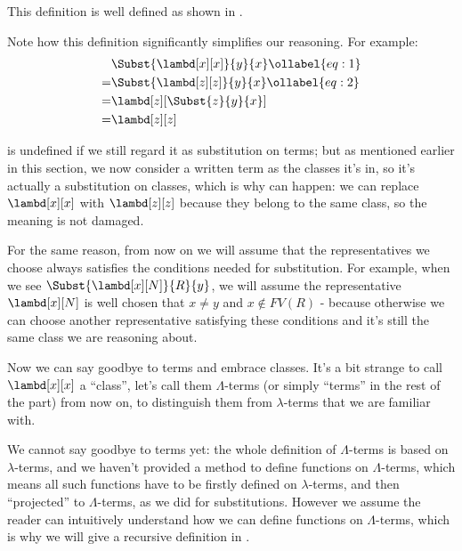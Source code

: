 \documentclass[../../../include/open-logic-section]{subfiles}
\begin{document}
This definition is well defined as shown in .

Note how this definition significantly simplifies our reasoning. For
example:
\begin{align}
  &\Subst{\lambd[x][x]}{y}{x} \ollabel{eq:1}\\
  =&\Subst{\lambd[z][z]}{y}{x} \ollabel{eq:2}\\
  =&\lambd[z][\Subst{z}{y}{x}] \\
  =&\lambd[z][z]
\end{align}

 is undefined if we still regard it as substitution on
terms; but as mentioned earlier in this section, we now consider a
written term as the classes it's in, so it's actually a substitution
on classes, which is why  can happen: we can replace
$\lambd[x][x]$ with $\lambd[z][z]$ because they belong to the same
class, so the meaning is not damaged.

For the same reason, from now on we will assume that the
representatives we choose always satisfies the conditions needed for
substitution. For example, when we see $\Subst{\lambd[x][N]}{R}{y}$,
we will assume the representative $\lambd[x][N]$ is well chosen that
$x \neq y$ and $x \notin FV(R)$ - because otherwise we can choose another
representative satisfying these conditions and it's still the same
class we are reasoning about.

Now we can say goodbye to terms and embrace classes. It's a bit
strange to call $\lambd[x][x]$ a ``class'', let's call them
$\Lambda$-terms (or simply ``terms'' in the rest of the part) from now on,
to distinguish them from $\lambda$-terms that we are familiar with. 

\begin{editorial}
  We cannot say goodbye to terms yet: the whole definition of
  $\Lambda$-terms is based on $\lambda$-terms, and we haven't provided
  a method to define functions on $\Lambda$-terms, which means all
  such functions have to be firstly defined  on $\lambda$-terms, and
  then ``projected'' to $\Lambda$-terms, as we did for substitutions.
  However we assume the reader can intuitively understand how we can
  define functions on $\Lambda$-terms, which is why we will give a
  recursive definition in .
\end{editorial}
\end{document}
